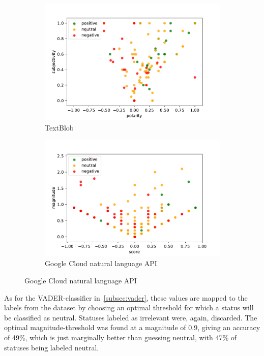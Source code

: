 \begin{figure}
    \centering
    \caption{Sentiment classification results on a scatter plot}
    \label{fig:sentiment_results_scatter}
    \begin{subfigure}{.5\textwidth}
        \centering
        \caption{TextBlob}
        \label{fig:textblob}
        \includegraphics[width=\textwidth]{../figures/textblob.pdf}
    \end{subfigure}%
    \begin{subfigure}{.5\textwidth}
        \centering
        \caption{Google Cloud natural language API}
        \label{fig:gcloud}
        \includegraphics[width=\textwidth]{../figures/gcloud.pdf}
    \end{subfigure}
\end{figure}

As for the VADER-classifier in~\cref{subsec:vader}, these values are mapped to the labels from the dataset by
choosing an optimal threshold for which a status will be classified as neutral.
Statuses labeled as irrelevant were, again, discarded.
The optimal magnitude-threshold was found at a magnitude of 0.9, giving an accuracy of 49\%,
which is just marginally better than guessing neutral, with 47\% of statuses being labeled neutral.

